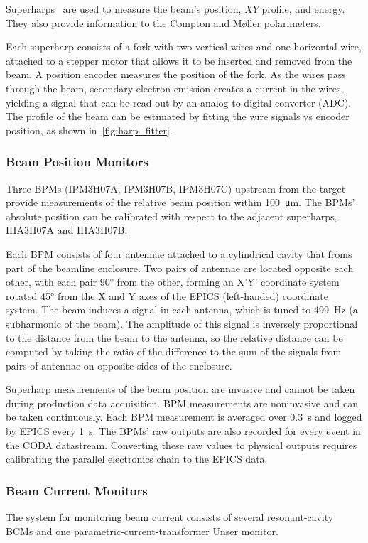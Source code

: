 Superharps~\cite{Yan_1995} are used to measure the beam's position, $XY$
profile, and energy.
They also provide information to the Compton and M\o{}ller polarimeters.


Each superharp consists of a fork with two vertical wires and one horizontal
wire, attached to a stepper motor that allows it to be inserted and removed
from the beam.
A position encoder measures the position of the fork.
As the wires pass through the beam, secondary electron emission creates a
current in the wires, yielding a signal that can be read out by an
analog-to-digital converter (ADC).
The profile of the beam can be estimated by fitting the wire signals
vs encoder position, as shown in~\ref{fig:harp_fitter}.


\subsubsection{Beam Position Monitors}
Three BPMs (IPM3H07A, IPM3H07B, IPM3H07C) upstream from the target provide
measurements of the relative beam position within \SI{100}{\micro\meter}.
The BPMs' absolute position can be calibrated with respect to the adjacent
superharps, IHA3H07A and IHA3H07B.


Each BPM consists of four antennae attached to a cylindrical cavity that froms
part of the beamline enclosure.
Two pairs of antennae are located opposite each other, with each pair \ang{90}
from the other, forming an X'Y' coordinate system rotated \ang{45} from the
X and Y axes of the EPICS (left-handed) coordinate system.
The beam induces a signal in each antenna, which is tuned to \SI{499}{Hz}
(a subharmonic of the beam).
The amplitude of this signal is inversely proportional to the distance from the
beam to the antenna, so the relative distance can be computed by taking the
ratio of the difference to the sum of the signals from pairs of antennae on
opposite sides of the enclosure.


Superharp measurements of the beam position are invasive and cannot be taken
during production data acquisition.
BPM measurements are noninvasive and can be taken continuously.
Each BPM measurement is averaged over \SI{0.3}{s} and logged by EPICS every
\SI{1}{s}.
The BPMs' raw outputs are also recorded for every event in the CODA datastream.
Converting these raw values to physical outputs requires calibrating the
parallel electronics chain to the EPICS data.

\subsubsection{Beam Current Monitors}
The system for monitoring beam current consists of several resonant-cavity BCMs
and one parametric-current-transformer Unser monitor.


